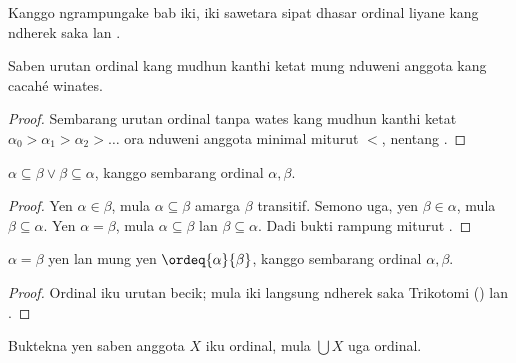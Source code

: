 \documentclass[../../../include/open-logic-section]{subfiles}
\begin{document}
Kanggo ngrampungake bab iki, iki sawetara sipat
dhasar ordinal liyane kang ndherek saka
 lan .

\begin{prop}
Saben urutan ordinal kang mudhun kanthi ketat mung
nduweni anggota kang cacahé winates.
\end{prop}

\begin{proof}
Sembarang urutan ordinal tanpa wates kang mudhun
kanthi ketat $\alpha_0 > \alpha_1 > \alpha_2 > \ldots$
ora nduweni anggota minimal miturut $<$,
nentang .
\end{proof}

\begin{prop}
$\alpha \subseteq \beta \lor \beta \subseteq \alpha$,
kanggo sembarang ordinal $\alpha, \beta$.
\end{prop}

\begin{proof}
Yen $\alpha \in \beta$, mula $\alpha \subseteq \beta$
amarga $\beta$ transitif. Semono uga, yen
$\beta \in \alpha$, mula $\beta \subseteq \alpha$.
Yen $\alpha = \beta$, mula $\alpha \subseteq \beta$
lan $\beta \subseteq \alpha$. Dadi bukti rampung
miturut .
\end{proof}

\begin{prop}
$\alpha = \beta$ yen lan mung yen
$\ordeq{\alpha}{\beta}$, kanggo sembarang ordinal
$\alpha, \beta$.
\end{prop}

\begin{proof}
Ordinal iku urutan becik; mula iki langsung ndherek
saka Trikotomi () lan
.
\end{proof}

\begin{prob}
Buktekna yen saben anggota $X$ iku ordinal,
mula $\bigcup X$ uga ordinal.
\end{prob}
\end{document}
